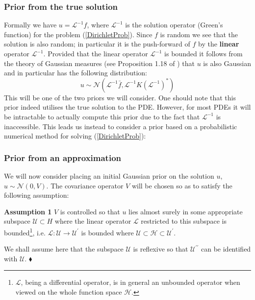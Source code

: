 \subsubsection{Prior from the true solution}

Formally we have $u=\mathcal{L}^{-1}f$, where $\mathcal{L}^{-1}$ is the solution operator (Green's function) for the problem (\ref{DirichletProb}). Since $f$ is random we see that the solution is also random; in particular it is the push-forward of $f$ by the \textbf{linear} operator $\mathcal{L}^{-1}$. Provided that the linear operator $\mathcal{L}^{-1}$ is bounded it follows from the theory of Gaussian measures (see Proposition 1.18 of \textcolor{blue}{\cite{da2006introduction}}) that $u$ is also Gaussian and in particular has the following distribution:
\begin{equation}
    \label{true_prior}
    u\sim\mathcal{N}(\mathcal{L}^{-1}\bar{f},\mathcal{L}^{-1}K(\mathcal{L}^{-1})^{*})
\end{equation}
This will be one of the two priors we will consider. One should note that this prior indeed utilises the true solution to the PDE. However, for most PDEs it will be intractable to actually compute this prior due to the fact that $\mathcal{L}^{-1}$ is inaccessible. This leads us instead to consider a prior based on a probabilistic numerical method for solving (\ref{DirichletProb}):

\subsubsection{Prior from an approximation}

We will now consider placing an initial Gaussian prior on the solution $u$, $u\sim\mathcal{N}(0,V)$. The covariance operator $V$ will be chosen so as to satisfy the following assumption:

\noindent \textbf{Assumption 1} $V$ is controlled so that $u$ lies almost surely in some appropriate subspace $\mathcal{U}\subset{H}$ where the linear operator $\mathcal{L}$ restricted to this subspace is bounded\footnote{$\mathcal{L}$, being a differential operator, is in general an unbounded operator when viewed on the whole function space $\mathcal{H}$.}, i.e. $\mathcal{L}:\mathcal{U}\rightarrow\mathcal{U}^{\prime}$ is bounded where $\mathcal{U}\subset\mathcal{H}\subset{\mathcal{U}^{\prime}}$.
\begin{remark}
    We shall assume here that the subspace $\mathcal{U}$ is reflexive so that $\mathcal{U}^{\prime\prime}$ can be identified with $\mathcal{U}$.
    $\mathbin{\blacklozenge}$
\end{remark}

